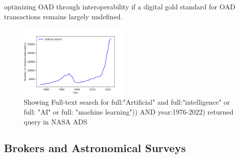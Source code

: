 \documentclass[final,5p,times,twocolumn,authoryear]{elsarticle}
\begin{document}
optimizing OAD through interoperability if a digital gold standard for OAD transactions remains largely undefined.  
 \begin{figure}
    \centering
    \includegraphics[width=0.48\textwidth]{figs/fulltextai.png}
    \vspace*{-0.4cm}
    \caption{Showing Full-text search for  full:"Artificial" and full:"intelligence" or full: "AI" or full: "machine learning")) AND year:1976-2022) returned query in NASA ADS}
    \label{fig:ai}
\end{figure}


\subsection{ Brokers and Astronomical Surveys}
\end{document}
